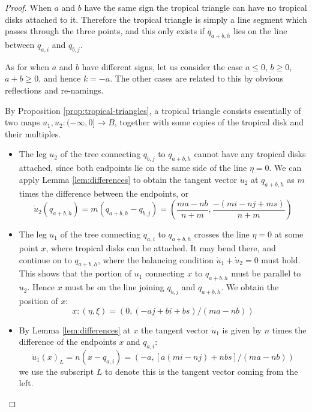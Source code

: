 \documentclass[12pt]{amsart}
\begin{document}
\begin{proof}
When $a$ and $b$ have the same sign the tropical triangle can have no
tropical disks attached to it. Therefore the tropical triangle is
simply a line segment which passes through the three points, and this
only exists if $q_{a+b,h}$ lies on the line between $q_{a,i}$ and $q_{b,j}$.

As for when $a$ and $b$ have different signs, let us consider the case
$a \leq 0$, $b \geq 0$, $a+b \geq 0$, and hence $k = -a$. The other
cases are related to this by obvious reflections and re-namings.

By Proposition \ref{prop:tropical-triangles}, a tropical triangle
consists essentially of two maps $u_1, u_2: (-\infty,0]\to B$,
together with some copies of the tropical disk and their multiples.

\begin{itemize}
\item The leg $u_2$ of the tree connecting $q_{b,j}$ to $q_{a+b,h}$
  cannot have any tropical disks attached, since both endpoints lie on
  the same side of the line $\eta = 0$. We can apply Lemma
  \ref{lem:differences} to obtain the tangent vector $\dot{u}_2$ at
  $q_{a+b,h}$ as $m$ times the difference between the
  endpoints, or
  \begin{equation}
    \dot{u}_2(q_{a+b,h}) = m(q_{a+b,h}-q_{b,j}) = \left(\frac{ma-nb}{n+m}, \frac{-(mi-nj+ms)}{n+m}\right)
  \end{equation}

\item The leg $u_1$ of the tree connecting $q_{a,i}$ to $q_{a+b,h}$
  crosses the line $\eta = 0$ at some point $x$, where tropical disks
  can be attached. It may bend there, and continue on to
  $q_{a+b,h}$, where the balancing condition $\dot{u}_1 + \dot{u}_2 =
  0$ must hold. This shows that the portion of $u_1$ connecting $x$ to
  $q_{a+b,h}$ must be parallel to $u_2$. Hence $x$ must be on the line
  joining $q_{b,j}$ and $q_{a+b,h}$. We obtain the position
  of $x$:
\begin{equation}
  x:   (\eta,\xi) = (0,(-aj+bi+bs)/(ma-nb))
\end{equation}

\item By Lemma \ref{lem:differences} at $x$ the tangent vector
  $\dot{u}_1$ is given by $n$ times
  the difference of the endpoints $x$ and $q_{a,i}$:
\begin{equation}
  \dot{u}_1(x)_L = n(x - q_{a,i}) = (-a,[a(mi-nj)+nbs]/(ma-nb))
\end{equation}
we use the subscript $L$ to denote this is the tangent vector coming
from the left.


\end{itemize}
\end{proof}
\end{document}
